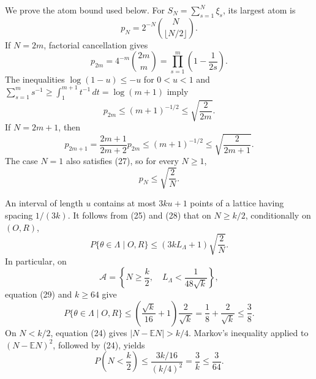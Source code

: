 We prove the atom bound used below.  For
\(S_N=\sum_{s=1}^N\xi_s\), its largest atom is
\[
 p_N=2^{-N}\binom{N}{\lfloor N/2\rfloor}.
\]
If \(N=2m\), factorial cancellation gives
\[
 p_{2m}=4^{-m}\binom{2m}{m}
       =\prod_{s=1}^m\left(1-\frac1{2s}\right).
\]
The inequalities \(\log(1-u)\le-u\) for \(0<u<1\) and
\(\sum_{s=1}^m s^{-1}\ge\int_1^{m+1}t^{-1}\,dt=\log(m+1)\) imply
\[
 p_{2m}\le(m+1)^{-1/2}\le\sqrt{\frac2{2m}}.
\tag{26}
\]
If \(N=2m+1\), then
\[
 p_{2m+1}=\frac{2m+1}{2m+2}p_{2m}
 \le(m+1)^{-1/2}
 \le\sqrt{\frac2{2m+1}}.
\tag{27}
\]
The case \(N=1\) also satisfies (27), so for every \(N\ge1\),
\[
 p_N\le\sqrt{\frac2N}.
\tag{28}
\]

An interval of length \(u\) contains at most \(3ku+1\) points of a
lattice having spacing \(1/(3k)\).  It follows from (25) and (28) that
on \(N\ge k/2\), conditionally on \((O,R)\),
\[
 P\{\theta\in\Lambda\mid O,R\}
 \le(3kL_\Lambda+1)\sqrt{\frac2N}.
\tag{29}
\]
In particular, on
\[
 \mathcal A=\left\{N\ge\frac k2,\quad
 L_\Lambda<\frac1{48\sqrt{k}}\right\},
\]
equation (29) and \(k\ge64\) give
\[
 P\{\theta\in\Lambda\mid O,R\}
 \le\left(\frac{\sqrt{k}}{16}+1\right)\frac2{\sqrt{k}}
 =\frac18+\frac2{\sqrt{k}}
 \le\frac38.
\tag{30}
\]
On \(N<k/2\), equation (24) gives
\(|N-\mathbb EN|>k/4\).  Markov's inequality applied to
\((N-\mathbb EN)^2\), followed by (24), yields
\[
 P\left(N<\frac k2\right)
 \le\frac{3k/16}{(k/4)^2}
 =\frac3k\le\frac3{64}.
\tag{31}
\]

